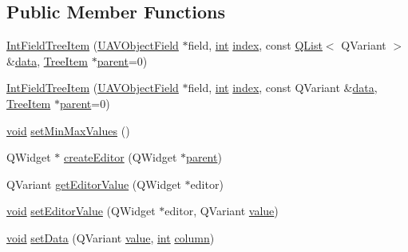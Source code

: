 \subsection*{Public Member Functions}
\begin{DoxyCompactItemize}
\item 
\hyperlink{group___u_a_v_object_browser_plugin_ga4ca34e25fd72802feaeb4123607bb7c4}{Int\-Field\-Tree\-Item} (\hyperlink{class_u_a_v_object_field}{U\-A\-V\-Object\-Field} $\ast$field, \hyperlink{ioapi_8h_a787fa3cf048117ba7123753c1e74fcd6}{int} \hyperlink{glext_8h_ab47dd9958bcadea08866b42bf358e95e}{index}, const \hyperlink{class_q_list}{Q\-List}$<$ Q\-Variant $>$ \&\hyperlink{glext_8h_a8850df0785e6fbcc2351af3b686b8c7a}{data}, \hyperlink{class_tree_item}{Tree\-Item} $\ast$\hyperlink{group___u_a_v_object_browser_plugin_gaa3a7ba624312b6be70872634db291881}{parent}=0)
\item 
\hyperlink{group___u_a_v_object_browser_plugin_gab944da4a69d80c272ecb2cd56cb68a21}{Int\-Field\-Tree\-Item} (\hyperlink{class_u_a_v_object_field}{U\-A\-V\-Object\-Field} $\ast$field, \hyperlink{ioapi_8h_a787fa3cf048117ba7123753c1e74fcd6}{int} \hyperlink{glext_8h_ab47dd9958bcadea08866b42bf358e95e}{index}, const Q\-Variant \&\hyperlink{glext_8h_a8850df0785e6fbcc2351af3b686b8c7a}{data}, \hyperlink{class_tree_item}{Tree\-Item} $\ast$\hyperlink{group___u_a_v_object_browser_plugin_gaa3a7ba624312b6be70872634db291881}{parent}=0)
\item 
\hyperlink{group___u_a_v_objects_plugin_ga444cf2ff3f0ecbe028adce838d373f5c}{void} \hyperlink{group___u_a_v_object_browser_plugin_ga04070de761838b1f1df2c69a3b0c4529}{set\-Min\-Max\-Values} ()
\item 
Q\-Widget $\ast$ \hyperlink{group___u_a_v_object_browser_plugin_ga1ce7bba5d398e5db5afb25a1fdecc2cd}{create\-Editor} (Q\-Widget $\ast$\hyperlink{group___u_a_v_object_browser_plugin_gaa3a7ba624312b6be70872634db291881}{parent})
\item 
Q\-Variant \hyperlink{group___u_a_v_object_browser_plugin_ga1bfea485d5919a5c2548115597aa5644}{get\-Editor\-Value} (Q\-Widget $\ast$editor)
\item 
\hyperlink{group___u_a_v_objects_plugin_ga444cf2ff3f0ecbe028adce838d373f5c}{void} \hyperlink{group___u_a_v_object_browser_plugin_ga5c67d501056c61f098c9166f9e8bdef5}{set\-Editor\-Value} (Q\-Widget $\ast$editor, Q\-Variant \hyperlink{glext_8h_aa0e2e9cea7f208d28acda0480144beb0}{value})
\item 
\hyperlink{group___u_a_v_objects_plugin_ga444cf2ff3f0ecbe028adce838d373f5c}{void} \hyperlink{group___u_a_v_object_browser_plugin_ga3a9f3c8507db3aeab86e7bfafd5ab91b}{set\-Data} (Q\-Variant \hyperlink{glext_8h_aa0e2e9cea7f208d28acda0480144beb0}{value}, \hyperlink{ioapi_8h_a787fa3cf048117ba7123753c1e74fcd6}{int} \hyperlink{glext_8h_a3b58c39b1b7ca6f4012b27e84de3bdb3}{column})

\end{DoxyCompactItemize}
